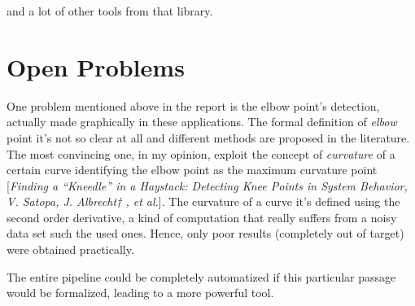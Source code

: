 \documentclass{article}
\begin{document}
and a lot of other tools from that library.

\section*{Open Problems}
One problem mentioned above in the report is the elbow point's detection, actually made graphically in these applications.
The formal definition of \emph{elbow} point it's not so clear at all and different methods are proposed in the literature. The most convincing one, in my opinion, exploit the concept of \emph{curvature} of a certain curve identifying the elbow point as the maximum curvature point [\textit{Finding a “Kneedle” in a Haystack: Detecting Knee Points in System Behavior, V. Satopa, J. Albrecht† , et al.}]. The curvature of a curve it's defined using the second order derivative, a kind of computation that really suffers from a noisy data set such the used ones. Hence, only poor results (completely out of target) were obtained practically.

The entire pipeline could be completely automatized if this particular passage would be formalized, leading to a more powerful tool.


\newpage
\end{document}
